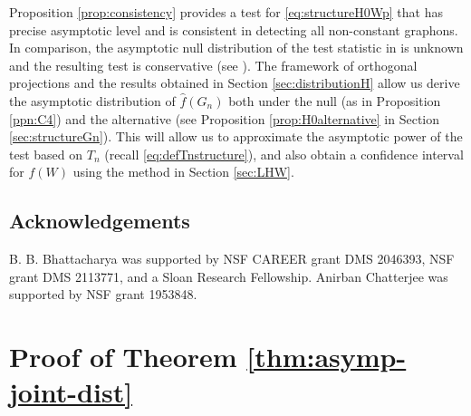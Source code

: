 \documentclass[11pt,reqno]{amsart}
\numberwithin{equation}{section}
\theoremstyle{definition}
\begin{document}
Proposition \ref{prop:consistency} provides a test for  \eqref{eq:structureH0Wp} that has precise asymptotic level and is consistent in detecting all non-constant graphons. In comparison, the asymptotic null distribution of the test statistic in \citet{fangandrollin2015} is unknown and the resulting test is conservative (see \cite[Remark 3.3]{fangandrollin2015}). The framework of orthogonal projections and the results obtained in Section \ref{sec:distributionH} allow us derive the asymptotic distribution of $\hat f(G_n)$ both under the null (as in Proposition \ref{ppn:C4}) and the alternative (see Proposition \ref{prop:H0alternative} in Section \ref{sec:structureGn}). This will allow us to approximate the asymptotic power of the test based on $T_n$ (recall \eqref{eq:defTnstructure}), and also obtain a confidence interval for $f(W)$ using the method in Section \ref{sec:LHW}. 





\small


\subsection*{Acknowledgements} 
B. B. Bhattacharya was supported by NSF CAREER grant DMS 2046393, NSF grant DMS 2113771, and a Sloan Research Fellowship. Anirban Chatterjee was supported by NSF grant 1953848. 



 

\normalsize 



\appendix 

\section{Proof of Theorem \ref{thm:asymp-joint-dist}} 
\label{sec:distributionpf}
\end{document}
